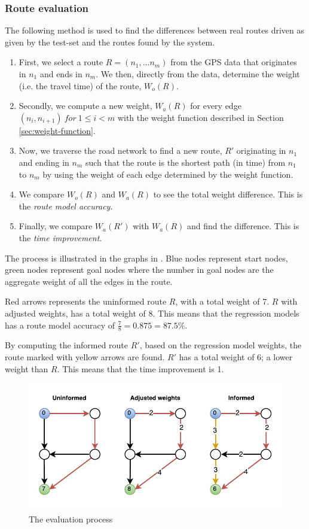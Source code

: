 \subsubsection{Route evaluation}
The following method is used to find the differences between real routes driven as given by the test-set and the routes found by the system.
\begin{enumerate}
\item First, we select a route $R=(n_1,...n_m)$ from the GPS data that originates in $n_1$ and ends in $n_m$. We then, directly from the data, determine the weight (i.e. the travel time) of the route, $W_o(R)$.
\item Secondly, we compute a new weight, $W_{a}(R)$ for every edge $(n_i,n_{i+1}) \  for \  1 \leq i < m$ with the weight function described in Section \ref{sec:weight-function}.
\item Now, we traverse the road network to find a new route, $R'$ originating in $n_1$ and ending in $n_m$ such that the route is the shortest path (in time) from $n_1$ to $n_m$ by using the weight of each edge determined by the weight function.
\item We compare $W_o(R)$ and $W_a(R)$ to see the total weight difference. This is the \emph{route model accuracy}.
\item Finally, we compare $W_a(R')$ with $W_a(R)$ and find the difference. This is the \emph{time improvement}.
\end{enumerate}
The process is illustrated in the graphs in . Blue nodes represent start nodes, green nodes represent goal nodes where the number in goal nodes are the aggregate weight of all the edges in the route. 

Red arrows represents the uninformed route $R$, with a total weight of 7. $R$ with adjusted weights, has a total weight of 8. This means that the regression models has a route model accuracy of $\frac{7}{8}=0.875=87.5\%$. 

By computing the informed route $R'$, based on the regression model weights, the route marked with yellow arrows are found. $R'$ has a total weight of 6; a lower weight than $R$. This means that the time improvement is 1.

\begin{figure}
\centering
\includegraphics[width=\textwidth]{figures/eval.pdf}
\caption{The evaluation process}
\label{fig:eval}
\end{figure}


